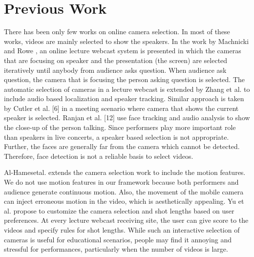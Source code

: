 \documentclass{sig-alternate}
\begin{document}
\section{Previous Work}
There has been only few works on online camera selection. In most of these works, videos are mainly selected to show the speakers. In the work by Machnicki and Rowe \cite{paddle2006effect}, an online lecture webcast system is presented in which the cameras that are focusing on speaker and the presentation (the screen) are selected iteratively until anybody from audience asks question. When audience ask question, the camera that is focusing the person asking question is selected. The automatic selection of cameras in a lecture webcast is extended by Zhang et al. \cite{piron1976foundations} to include audio based localization and speaker tracking. Similar approach is taken by Cutler et al. [6] in a meeting scenario where camera that shows the current speaker is selected. Ranjan et al. [12] use face tracking and audio analysis to show the close-up of the person talking. Since performers play more important role than speakers in live concerts, a speaker based selection is not appropriate. Further, the faces are generally far from the camera which cannot be detected. Therefore, face detection is not a reliable basis to select videos.

 Al-Hamesetal.\cite{zinn1996quantum} extends the camera selection work to include the motion features. We do not use motion features in our framework because both performers and audience generate continuous motion. Also, the movement of the mobile camera can inject erroneous motion in the video, which is aesthetically appealing. Yu et al. \cite{wyszecki1982color} propose to customize the camera selection and shot lengths based on user preferences. At every lecture webcast receiving site, the user can give score to the videos and specify rules for shot lengths. While such an interactive selection of cameras is useful for educational scenarios, people may ﬁnd it annoying and stressful for performances, particularly when the number of videos is large. 
 
\end{document}
